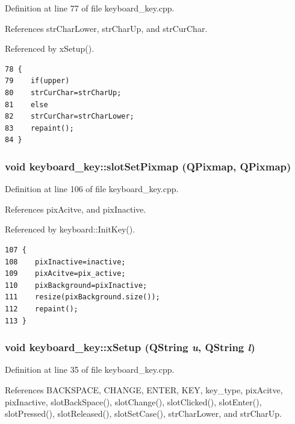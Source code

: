 Definition at line 77 of file keyboard\_\-key.cpp.

References str\-Char\-Lower, str\-Char\-Up, and str\-Cur\-Char.

Referenced by x\-Setup().



\footnotesize\begin{verbatim}78 {
79    if(upper)
80    strCurChar=strCharUp;
81    else
82    strCurChar=strCharLower;
83    repaint();
84 }
\end{verbatim}\normalsize 
{}
\subsubsection{\setlength{\rightskip}{0pt plus 5cm}void keyboard\_\-key::slot\-Set\-Pixmap (QPixmap, QPixmap)\hspace{0.3cm}{\tt  [slot]}}\label{classkeyboard__key_keyboard__keyi7}




Definition at line 106 of file keyboard\_\-key.cpp.

References pix\-Acitve, and pix\-Inactive.

Referenced by keyboard::Init\-Key().



\footnotesize\begin{verbatim}107 {
108    pixInactive=inactive;
109    pixAcitve=pix_active;
110    pixBackground=pixInactive;
111    resize(pixBackground.size());
112    repaint();
113 }
\end{verbatim}\normalsize 
{}
\subsubsection{\setlength{\rightskip}{0pt plus 5cm}void keyboard\_\-key::x\-Setup (QString {\em u}, QString {\em l})}\label{classkeyboard__key_keyboard__keya2}




Definition at line 35 of file keyboard\_\-key.cpp.

References BACKSPACE, CHANGE, ENTER, KEY, key\_\-type, pix\-Acitve, pix\-Inactive, slot\-Back\-Space(), slot\-Change(), slot\-Clicked(), slot\-Enter(), slot\-Pressed(), slot\-Released(), slot\-Set\-Case(), str\-Char\-Lower, and str\-Char\-Up.

